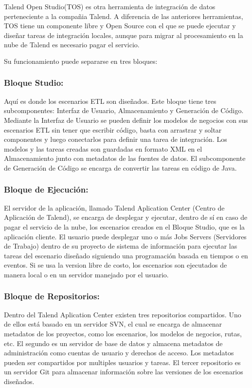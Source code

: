 Talend Open Studio(TOS) es otra herramienta de integración de datos perteneciente a la compañia Talend. A diferencia de las 
anteriores herramientas, TOS tiene un componente libre y Open Source con el que se puede ejecutar y diseñar tareas de 
integraci\'on locales, aunque para migrar al procesamiento en la nube de Talend es necesario pagar el servicio. 

Su funcionamiento puede separarse en 
tres bloques: 

\subsubsection{Bloque Studio:}

Aqu\'i es donde los escenarios ETL son diseñados. Este bloque tiene tres subcomponentes: Interfaz de Usuario, Almacenamiento
y Generaci\'on de C\'odigo. Mediante la Interfaz de Usuario se pueden definir los modelos de negocios con sus escenarios ETL 
sin tener que escribir c\'odigo, basta con arrastrar y soltar componentes y luego conectarlos para definir una tarea de 
integración. Los modelos y las tareas creadas son guardadas en formato XML en el Almacenamiento junto con metadatos 
de las fuentes de datos. El subcomponente de Generaci\'on de C\'odigo se encarga de convertir las tareas en c\'odigo de 
Java. 

\subsubsection{Bloque de Ejecución:}

El servidor de la aplicaci\'on, llamado Talend Aplication 
Center (Centro de Aplicaci\'on de Talend), se encarga de desplegar y ejecutar, dentro de s\'i en caso de pagar el 
servicio de la nube, los escenarios creados 
en el Bloque Studio, que es la aplicaci\'on cliente. El usuario puede desplegar uno o m\'as Jobs Servers 
(Servidores de Trabajo) dentro de su proyecto de sistema de informaci\'on para ejecutar las tareas del escenario diseñado 
siguiendo una programación basada en tiempos o en eventos. Si se usa la version libre de costo, los escenarios son 
ejecutados de manera local o en un servidor manejado por el usuario.

\subsubsection{Bloque de Repositorios:}

Dentro del Talend Aplication Center existen tres repositorios compartidos. Uno de ellos est\'a basado en un servidor SVN, 
el cual se encarga de almacenar metadatos de los proyectos, como los escenarios, los modelos de negocios, rutas, etc. 
El segundo es un servidor de base de datos y almacena metadatos de administraci\'on como cuentas de usuario y derechos de 
acceso. Los metadatos pueden ser compartidos por multiples usuarios y tareas. El tercer repositorio es un servidor 
Git para almacenar informaci\'on sobre las versiones de los escenarios diseñados.





